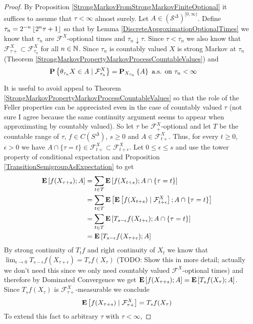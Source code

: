 \begin{proof}
By Proposition \ref{StrongMarkovFromStrongMarkovFiniteOptional} it suffices to assume that $\tau<\infty$ almost surely.  Let $A \in (\mathcal{S}^\Delta)^{[0,\infty)}$.  Define $\tau_n = 2^{-n}\floor{2^n \tau + 1}$ so that by Lemma \ref{DiscreteApproximationOptionalTimes} we know that $\tau_n$ are $\mathcal{F}^X$-optional times and $\tau_n \downarrow \tau$.  Since $\tau < \tau_n$ we also know that $\mathcal{F}^X_{\tau+} \subset \mathcal{F}^X_{\tau_n}$ for all $n \in \naturals$.  Since $\tau_n$ is countably valued $X$ is strong Markov at $\tau_n$ (Theorem \ref{StrongMarkovPropertyMarkovProcessCountableValues}) and
\begin{align*}
\cprobability{\mathcal{F}^X_{\tau_n}}{\theta_{\tau_n} X \in A} &=
\sprobability{A}{X_{\tau_n}} \text{ a.s. on $\tau_n < \infty$}
\end{align*}

It is useful to avoid appeal to Theorem \ref{StrongMarkovPropertyMarkovProcessCountableValues} so that the role of the Feller properties can be appreciated even in the case of countably valued $\tau$ (not sure I agree because the same continuity argument seems to appear when approximating by countably valued).  So let $\tau$ be $\mathcal{F}^X_+$-optional and let $T$ be the countable range of $\tau$, $f \in C(S^\Delta)$, $s \geq 0$ and $A \in \mathcal{F}^X_{t+}$.  Thus,
for every $t \geq 0$, $\epsilon > 0$ we have $A \cap \lbrace \tau=t \rbrace \in \mathcal{F}^X_{t+} \subset \mathcal{F}^X_{t+\epsilon}$.  Let $0 \leq \epsilon \leq s$ and use
the tower property of conditional expectation and Proposition \ref{TransitionSemigroupAsExpectation} to get
\begin{align*}
\expectation{f(X_{\tau + s}) ; A} &= \sum_{t \in T} \expectation{f(X_{t + s}) ; A \cap \lbrace \tau=t \rbrace } \\
&= \sum_{t \in T} \expectation{\cexpectationlong{\mathcal{F}^X_{t+\epsilon}}{f(X_{t + s})} ; A \cap \lbrace \tau=t \rbrace} \\
&= \sum_{t \in T} \expectation{T_{s-\epsilon} f (X_{t + \epsilon}) ; A \cap \lbrace \tau=t \rbrace} \\
&= \expectation{T_{s-\epsilon} f (X_{\tau + \epsilon}) ; A} \\
\end{align*}
By strong continuity of $T_tf$ and right continuity of $X_t$ we know that $\lim_{\epsilon \to 0} T_{s-\epsilon} f (X_{\tau + \epsilon}) = T_s f(X_\tau)$ (TODO: Show this in more detail; actually we don't need this since we only need countably valued $\mathcal{F}^X$-optional times) and therefore by Dominated Convergence
we get $\expectation{f(X_{\tau + s}) ; A} = \expectation{T_{s} f (X_{\tau }) ; A} $.   Since $T_s f (X_\tau)$ is $\mathcal{F}^X_{\tau+}$-measurable we conclude 
\begin{align*}
\cexpectationlong{\mathcal{F}^X_{\tau+}}{f(X_{\tau + s})} = T_s f (X_\tau)
\end{align*}
To extend this fact to arbitrary $\tau$ with $\tau < \infty$,



\end{proof}
